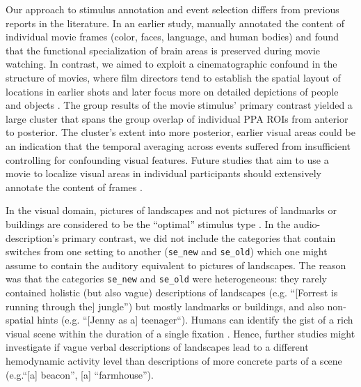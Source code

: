 \documentclass[english]{article}
\begin{document}
Our approach to stimulus annotation and event selection
differs from previous reports in the literature.
In an earlier study, \cite{bartels2004mapping} manually annotated the content of
individual movie frames (color, faces, language, and human bodies) and found
that the functional specialization of brain areas is preserved during movie
watching.
%
In contrast, we aimed to exploit a cinematographic confound in the structure of
movies, where
film directors tend to establish the spatial layout of locations in earlier
shots and later focus more on detailed depictions of people and objects
\citep{brown2012cinematography, katz1991film, mascelli1998five}.
The group results of the movie stimulus' primary contrast yielded a large cluster
that spans the group overlap of individual PPA ROIs from anterior to posterior.
The cluster's extent into more posterior, earlier visual areas could be
an indication that the temporal averaging across events suffered from
insufficient controlling for confounding visual features.
Future studies that aim to use a movie to localize visual areas in individual
participants should extensively annotate the content of frames \citep[e.g.,
using the open-source solution ``Pliers'' for feature extraction from a visual
naturalistic stimulus;][]{mcnamara2017developing}.

In the visual domain, pictures of landscapes and not pictures of landmarks or
buildings are considered to be the ``optimal'' stimulus type
\citep{epstein2008parahippocampal}.
In the audio-description's primary contrast, we did not include the categories
that contain switches from one setting to another (\texttt{se\_new} and
\texttt{se\_old}) which one might assume to contain the auditory equivalent to
pictures of landscapes.
The reason was that the categories \texttt{se\_new} and \texttt{se\_old} were
heterogeneous: they rarely contained holistic (but also vague) descriptions of
landscapes (e.g.  ``[Forrest is running through the] jungle'') but mostly
landmarks or buildings, and also non-spatial hints (e.g. ``[Jenny as a]
teenager``).
Humans can identify the gist of a rich visual scene within the duration of a
single fixation \citep{henderson2003human}.
%
Hence, further studies might investigate if vague verbal descriptions of
landscapes lead to a different hemodynamic activity level than descriptions of
more concrete parts of a scene (e.g.``[a] beacon'', [a] ``farmhouse'').
\end{document}

